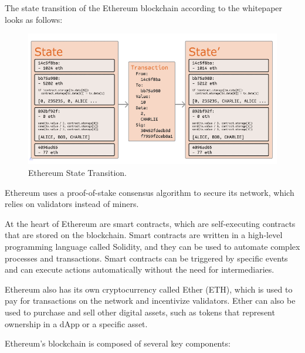 \documentclass{article}
\begin{document}
The state transition of the Ethereum blockchain according to the whitepaper \cite{ethereumWhitepaper} looks as follows:
\begin{figure}[H]
    \centering
    \includegraphics[width=\textwidth]{transition_ethWp.png}
    \caption{Ethereum State Transition.\cite{ethereumWhitepaper}}
\end{figure}

Ethereum uses a proof-of-stake consensus algorithm to secure its network, which relies on validators instead of miners.

At the heart of Ethereum are smart contracts, which are self-executing contracts that are stored on the blockchain. Smart contracts are written in a high-level programming language called Solidity, and they can be used to automate complex processes and transactions. Smart contracts can be triggered by specific events and can execute actions automatically without the need for intermediaries.

Ethereum also has its own cryptocurrency called Ether (ETH), which is used to pay for transactions on the network and incentivize validators. Ether can also be used to purchase and sell other digital assets, such as tokens that represent ownership in a dApp or a specific asset.

Ethereum's blockchain is composed of several key components:
\end{document}

